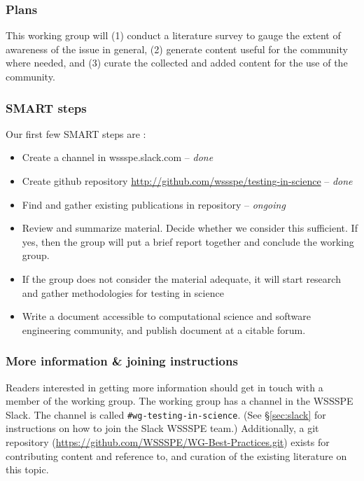\subsubsection{Plans}

This working group will (1) conduct a literature survey to gauge the extent
of awareness of the issue in general, (2) generate content useful for
the community where needed, and (3) curate the collected and added
content for the use of the community.


\subsubsection{SMART steps}

Our first few SMART steps are :
\begin{itemize}
\item Create a channel in wssspe.slack.com -- {\em done}
\item Create github repository
  {\url{http://github.com/wssspe/testing-in-science}} -- {\em done}
\item Find and gather existing publications in repository -- {\em ongoing}
\item Review and summarize material. Decide whether we consider this
  sufficient. If yes, then the group will put a brief report together and
  conclude the working group.
\item If the group does not consider the material adequate, it will start research
  and gather methodologies for testing in science
\item Write a document accessible to computational science and
  software engineering community, and publish document at a citable forum.
\end{itemize}

\subsubsection{More information \& joining instructions}

Readers interested in getting more information should get in touch
with a member of the working group. The working group
has a channel in the WSSSPE Slack. The channel is called
\texttt{\#wg-testing-in-science}.
(See \S\ref{sec:slack} for instructions on how to join the Slack WSSSPE team.)
Additionally, a git
repository (\url{https://github.com/WSSSPE/WG-Best-Practices.git}) exists for contributing content and reference to, and
curation of the existing literature on this topic.
